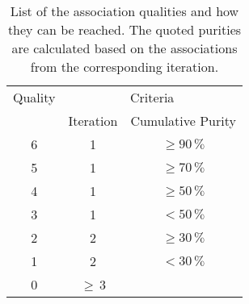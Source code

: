 
\begin{table}[h]
\begin{center}
\caption{List of the association qualities and how they can be reached. The quoted purities are calculated based on the associations from the corresponding iteration.}
\label{tab:AMWFQD}
\begin{tabular}{c c c}
Quality & \multicolumn{2}{c}{Criteria} \\
 & Iteration & Cumulative Purity \\
\midrule[2pt]
6 & 1 & $\geq 90\,\%$ \\
5 & 1 & $\geq 70\,\%$ \\
4 & 1 & $\geq 50\,\%$ \\
3 & 1 & $< 50\,\%$ \\
\midrule
2 & 2 & $\geq 30\,\%$ \\
1 & 2 & $< 30\,\%$ \\
\midrule
0 & $\geq$\,3 & \\
\end{tabular}
\end{center}
\end{table}